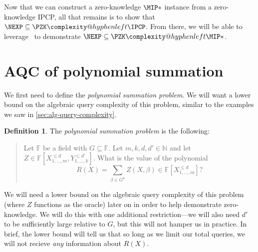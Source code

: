 \documentclass[english,12pt]{reedthesis}
\makeatletter
\theoremstyle{plain}
\theoremstyle{definition}
\newtheorem{defn}[defn]{Definition}
\theoremstyle{remark}
\newcommand{\PZKIPCP}{%
  \PZK\complexity@hyphenleft\IPCP
}
\newcommand{\PZKMIP}{%
  \PZK\complexity@hyphenleft\MIP
}
\makeatother
\begin{document}
Now that we can construct a zero-knowledge $\MIP*$ instance from a
zero-knowledge IPCP, all that remains is to show that $\NEXP \subseteq \PZKIPCP$. From
there, we will be able to leverage~\cite[Lemma 9.1]{CFGS22} to demonstrate
$\NEXP \subseteq \PZKMIP*$.

\section{AQC of polynomial summation}\label{sec:aqc-poly-sum}

We first need to define the \emph{polynomial summation problem}. We will want a
lower bound on the algebraic query complexity of this problem, similar to the
examples we saw in \cref{sec:alg-query-complexity}.

\begin{defn}\label{def:poly-sum}
  The \emph{polynomial summation problem} is the following:
  \begin{quote}
    Let $\mathbb{F}$ be a field with $G \subseteq \mathbb{F}$. Let $m, k, d, d' \in \mathbb{N}$ and
    let $Z \in \mathbb{F}[X_{1, \ldots, m}^{\le d}, Y_{1, \ldots, k}^{\le d'}]$.
    What is the value of the polynomial
    \[
      R(X) = \sum_{\beta \in G^{k}}Z(X, \beta) \in \mathbb{F}[X_{1, \ldots, m}^{\le d}]?
    \]
  \end{quote}
\end{defn}

We will need a lower bound on the algebraic query complexity of this problem
(where $Z$ functions as the oracle) later on in order to help demonstrate
zero-knowledge. We will do this with one additional restriction---we will also
need $d'$ to be sufficiently large relative to $G$, but this will not hamper us
in practice. In brief, the lower bound will tell us that so long as we limit
our total queries, we will not recieve \emph{any} information about $R(X)$.

\end{document}
